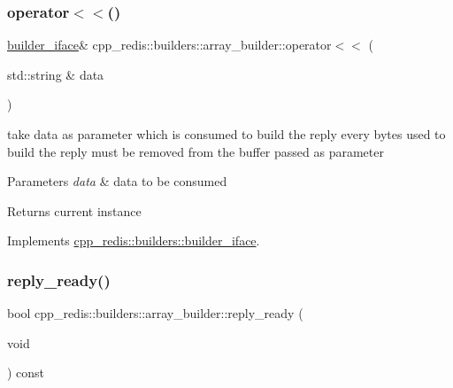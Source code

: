\mbox{\label{classcpp__redis_1_1builders_1_1array__builder_a043357d0ef70406adef4df78c8d5307f}} 
\subsubsection{\texorpdfstring{operator$<$$<$()}{operator<<()}}
{\footnotesize\ttfamily \hyperlink{classcpp__redis_1_1builders_1_1builder__iface}{builder\+\_\+iface}\& cpp\+\_\+redis\+::builders\+::array\+\_\+builder\+::operator$<$$<$ (\begin{DoxyParamCaption}\item[{std\+::string \&}]{data }\end{DoxyParamCaption})\hspace{0.3cm}{\ttfamily [virtual]}}

take data as parameter which is consumed to build the reply every bytes used to build the reply must be removed from the buffer passed as parameter


\begin{DoxyParams}{Parameters}
{\em data} & data to be consumed \\
\hline
\end{DoxyParams}
\begin{DoxyReturn}{Returns}
current instance 
\end{DoxyReturn}


Implements \hyperlink{classcpp__redis_1_1builders_1_1builder__iface_a9892bbc9c887c31c2742dad4476e2fa6}{cpp\+\_\+redis\+::builders\+::builder\+\_\+iface}.

\mbox{\label{classcpp__redis_1_1builders_1_1array__builder_a524f2cb943dde1246dea1b7057e6351e}} 
\subsubsection{\texorpdfstring{reply\+\_\+ready()}{reply\_ready()}}
{\footnotesize\ttfamily bool cpp\+\_\+redis\+::builders\+::array\+\_\+builder\+::reply\+\_\+ready (\begin{DoxyParamCaption}\item[{void}]{ }\end{DoxyParamCaption}) const\hspace{0.3cm}{\ttfamily [virtual]}}

